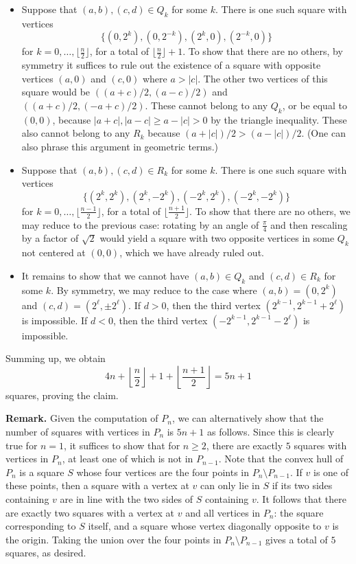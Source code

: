 \documentclass[amssymb,twocolumn,pra,10pt,aps]{revtex4-1}
\begin{document}
\begin{itemize}
\begin{itemize}
\item
Suppose that $(a,b), (c,d) \in Q_k$ for some $k$. 
There is one such square with vertices 
\[
\{(0, 2^k), (0, 2^{-k}), (2^k, 0), (2^{-k}, 0)\}
\]
for $k = 0,\dots,\lfloor \frac{n}{2} \rfloor$, for a total of $\lfloor \frac{n}{2} \rfloor + 1$.
To show that there are no others, by symmetry it suffices to rule out the existence of a square with
opposite vertices $(a,0)$ and $(c,0)$ where $a > \left| c \right|$. 
The other two vertices of this square would be $((a+c)/2, (a-c)/2)$ and $((a+c)/2, (-a+c)/2)$.
These cannot belong to any $Q_k$, or be equal to $(0,0)$,
because $|a+c|, |a-c| \geq a - |c| > 0$ by the triangle inequality.
These also cannot belong to any $R_k$ because $(a + |c|)/2 > (a - |c|)/2$. 
(One can also phrase this argument in geometric terms.)

\item
Suppose that $(a,b), (c,d) \in R_k$ for some $k$.
There is one such square with vertices
\[
\{(2^k, 2^k), (2^k, -2^k), (-2^k, 2^k), (-2^k, -2^k)\}
\]
for $k=0,\dots, \lfloor \frac{n-1}{2} \rfloor$, for a total of $\lfloor \frac{n+1}{2} \rfloor$.
To show that there are no others, we may reduce to the previous case: rotating by an angle of $\frac{\pi}{4}$ and then rescaling by a factor of $\sqrt{2}$ would yield a square with two opposite vertices in some $Q_k$ not centered at $(0,0)$, which we have already ruled out.

\item
It remains to show that we cannot have $(a,b) \in Q_k$ and $(c,d) \in R_k$ for some $k$.
By symmetry, we may reduce to the case where $(a,b) = (0, 2^k)$ and $(c,d) = (2^\ell, \pm 2^\ell)$.
If $d>0$, then the third vertex $(2^{k-1}, 2^{k-1} + 2^\ell)$ is impossible.
If $d<0$, then the third vertex $(-2^{k-1}, 2^{k-1} - 2^\ell)$ is impossible.

\end{itemize}

Summing up, we obtain
\[
4n + \left\lfloor \frac{n}{2} \right\rfloor + 1 + \left\lfloor \frac{n+1}{2} \right\rfloor = 5n+1
\]
squares, proving the claim.

\noindent
\textbf{Remark.}
Given the computation of $P_n$, we can alternatively show that the number of squares with vertices in $P_n$ is $5n+1$ as follows. Since this is clearly true for $n=1$, it suffices to show that for $n \geq 2$, there are exactly $5$ squares with vertices in $P_n$, at least one of which is not in $P_{n-1}$. Note that the convex hull of $P_n$ is a square $S$ whose four vertices are the four points in $P_n \setminus P_{n-1}$. If $v$ is one of these points, then a square with a vertex at $v$ can only lie in $S$ if its two sides containing $v$ are in line with the two sides of $S$ containing $v$. It follows that there are exactly two squares with a vertex at $v$ and all vertices in $P_n$: the square corresponding to $S$ itself, and a square whose vertex diagonally opposite to $v$ is the origin. Taking the union over the four points in $P_n \setminus P_{n-1}$ gives a total of $5$ squares, as desired. 


\end{itemize}
\end{document}
